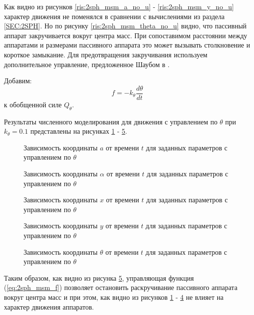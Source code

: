 Как видно из рисунков \ref{ris:2sph_msm_a_no_u} - \ref{ris:2sph_msm_y_no_u} характер движения не поменялся в сравнении с вычислениями из раздела \ref{SEC:2SPH}.
Но по рисунку \ref{ris:2sph_msm_theta_no_u} видно, что пассивный аппарат закручивается вокруг центра масс.
При сопоставимом расстоянии между аппаратами и размерами пассивного аппарата это может вызывать столкновение и короткое замыкание.
Для предотвращения закручивания используем дополнительное управление, предложенное Шаубом в \cite{3sph}.

Добавим:
\begin{equation}
\label{eq:2sph_msm_f}
	f = - k_\theta \frac{d\theta}{dt}
\end{equation}
к обобщенной силе $Q_\theta$.

Результаты численного моделирования для движения с управлением по $\theta$ при $k_\theta = 0.1$ представлены на рисунках \ref{ris:2sph_msm_a_full_u} - \ref{ris:2sph_msm_theta_full_u}.

\begin{figure}[H]
	\caption{Зависимость координаты $a$ от времени $t$ для заданных параметров с управлением по $\theta$}
	\label{ris:2sph_msm_a_full_u}
\end{figure}
\begin{figure}[H]
	\caption{Зависимость координаты $\alpha$ от времени $t$ для заданных параметров с управлением по $\theta$}
	\label{ris:2sph_msm_alpha_full_u}
\end{figure} 
\begin{figure}[H]
	\caption{Зависимость координаты $x$ от времени $t$ для заданных параметров с управлением по $\theta$}
	\label{ris:2sph_msm_x_full_u}
\end{figure} 
\begin{figure}[H]
	\caption{Зависимость координаты $y$ от времени $t$ для заданных параметров с управлением по $\theta$}
	\label{ris:2sph_msm_y_full_u}
\end{figure} 
\begin{figure}[H]
	\caption{Зависимость координаты $\theta$ от времени $t$ для заданных параметров с управлением по $\theta$}
	\label{ris:2sph_msm_theta_full_u}
\end{figure}

Таким образом, как видно из рисунка \ref{ris:2sph_msm_theta_full_u}, управляющая функция (\ref{eq:2sph_msm_f}) позволяет остановить раскручивание пассивного аппарата вокруг центра масс и при этом, как видно из рисунков \ref{ris:2sph_msm_a_full_u} - \ref{ris:2sph_msm_y_full_u} не влияет на характер движения аппаратов.